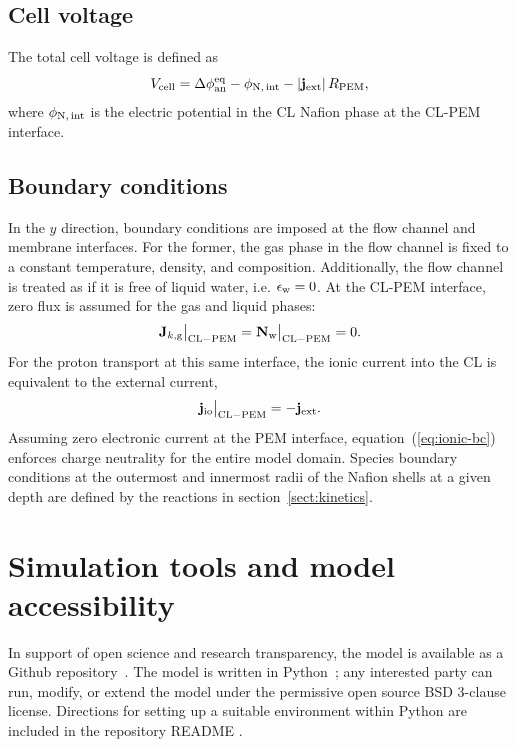 \documentclass[final,3p,times,twocolumn]{elsarticle}    %
\begin{document}
\subsection{Cell voltage}

The total cell voltage is defined as
\begin{equation}
    V_{\rm cell} = \Delta \phi_{\rm an}^{\rm eq} - \phi_{\rm N,\, int} - \vert{\bf j}_{\rm ext}\rvert\, R_{\rm PEM},
\end{equation}
where $\phi_{\rm N,\, int}$ is the electric potential in the CL Nafion phase at the CL-PEM interface.

\subsection{Boundary conditions}

In the $y$ direction, boundary conditions are imposed at the flow channel and membrane interfaces. For the former, the gas phase in the flow channel is fixed to a constant temperature, density, and composition. Additionally, the flow channel is treated as if it is free of liquid water, i.e. $\epsilon_{\rm w} = 0$. At the CL-PEM interface, zero flux is assumed for the gas and liquid phases:
\begin{equation}
    {\bf J}_{k,\rm g} \big|_{\rm CL-PEM} = {\bf N}_{\rm w} \big|_{\rm CL-PEM} = 0.
\end{equation}
For the proton transport at this same interface, the ionic current into the CL is equivalent to the external current,
\begin{equation} \label{eq:ionic-bc}
    {\bf j}_{\rm io} \big|_{\rm CL-PEM} = -{\bf j}_{\rm ext}.
\end{equation}
Assuming zero electronic current at the PEM interface, equation~(\ref{eq:ionic-bc}) enforces charge neutrality for the entire model domain. Species boundary conditions at the outermost and innermost radii of the Nafion shells at a given depth are defined by the reactions in section~\ref{sect:kinetics}. 


\section{Simulation tools and model accessibility}
In support of open science and research transparency, the model is available as a Github repository~\cite{bib:randall_2021}. The model is written in Python~\cite{bib:python_2022}; any interested party can run, modify, or extend the model under the permissive open source BSD 3-clause license. Directions for setting up a suitable environment within Python are included in the repository README .
\end{document}
